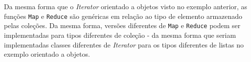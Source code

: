 Da mesma forma que o \textit{Iterator} orientado a 
objetos visto no exemplo anterior, as funções 
\texttt{Map} e \texttt{Reduce} são genéricas em relação ao tipo 
de elemento armazenado pelas coleções. Da 
mesma forma, versões diferentes de \texttt{Map} e 
\texttt{Reduce} podem ser implementadas para tipos 
diferentes de coleção - da mesma forma que 
seriam implementadas classes diferentes de 
\textit{Iterator} para os tipos diferentes de listas 
no exemplo orientado a objetos. 

